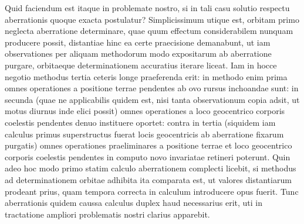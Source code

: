 Quid faciendum est itaque in problemate nostro, si in tali casu solutio respectu aberrationis quoque exacta postulatur? Simplicissimum utique est, orbitam primo neglecta aberratione determinare, quae quum effectum considerabilem nunquam producere possit, distantiae hinc ea certe praecisione demanabunt, ut iam observationes per aliquam methodorum modo expositarum ab aberratione purgare, orbitaeque determinationem accuratius iterare liceat. Iam in hocce negotio methodus tertia ceteris longe praeferenda erit: in methodo enim prima omnes operationes a positione terrae pendentes ab ovo rursus inchoandae sunt: in secunda (quae ne applicabilis quidem est, nisi tanta observationum copia adsit, ut motus diurnus inde elici possit) omnes operationes a loco geocentrico corporis coelestis pendentes denuo instituere oportet: contra in tertia (siquidem iam calculus primus superstructus fuerat locis geocentricis ab aberratione fixarum purgatis) omnes operationes praeliminares a positione terrae et loco geocentrico corporis coelestis pendentes in computo novo invariatae retineri poterunt. Quin adeo hoc modo primo statim calculo aberrationem complecti licebit, si methodus ad determinationem orbitae adhibita ita comparata est, ut valores distantiarum prodeant prius, quam tempora correcta in calculum introducere opus fuerit. Tunc aberrationis quidem caussa calculus duplex haud necessarius erit, uti in tractatione ampliori problematis nostri clarius apparebit.
